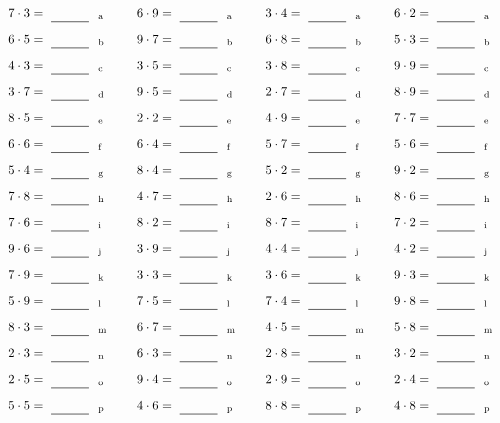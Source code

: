 \documentclass
[
  draft    = true,
  fontsize = 11pt,
  parskip  = half-
]
{scrartcl}
\begin{document}
\par\vfill\par
\begin{align*}
    \pline{7\cdot3}&=\rline{a}
  & \pline{6\cdot9}&=\rline{a}
  & \pline{3\cdot4}&=\rline{a}
  & \pline{6\cdot2}&=\rline{a} \\[1ex]
    \pline{6\cdot5}&=\rline{b}
  & \pline{9\cdot7}&=\rline{b}
  & \pline{6\cdot8}&=\rline{b}
  & \pline{5\cdot3}&=\rline{b} \\[1ex]
    \pline{4\cdot3}&=\rline{c}
  & \pline{3\cdot5}&=\rline{c}
  & \pline{3\cdot8}&=\rline{c}
  & \pline{9\cdot9}&=\rline{c} \\[1ex]
    \pline{3\cdot7}&=\rline{d}
  & \pline{9\cdot5}&=\rline{d}
  & \pline{2\cdot7}&=\rline{d}
  & \pline{8\cdot9}&=\rline{d} \\[1ex]
    \pline{8\cdot5}&=\rline{e}
  & \pline{2\cdot2}&=\rline{e}
  & \pline{4\cdot9}&=\rline{e}
  & \pline{7\cdot7}&=\rline{e} \\[1ex]
    \pline{6\cdot6}&=\rline{f}
  & \pline{6\cdot4}&=\rline{f}
  & \pline{5\cdot7}&=\rline{f}
  & \pline{5\cdot6}&=\rline{f} \\[1ex]
    \pline{5\cdot4}&=\rline{g}
  & \pline{8\cdot4}&=\rline{g}
  & \pline{5\cdot2}&=\rline{g}
  & \pline{9\cdot2}&=\rline{g} \\[1ex]
    \pline{7\cdot8}&=\rline{h}
  & \pline{4\cdot7}&=\rline{h}
  & \pline{2\cdot6}&=\rline{h}
  & \pline{8\cdot6}&=\rline{h} \\[1ex]
    \pline{7\cdot6}&=\rline{i}
  & \pline{8\cdot2}&=\rline{i}
  & \pline{8\cdot7}&=\rline{i}
  & \pline{7\cdot2}&=\rline{i} \\[1ex]
    \pline{9\cdot6}&=\rline{j}
  & \pline{3\cdot9}&=\rline{j}
  & \pline{4\cdot4}&=\rline{j}
  & \pline{4\cdot2}&=\rline{j} \\[1ex]
    \pline{7\cdot9}&=\rline{k}
  & \pline{3\cdot3}&=\rline{k}
  & \pline{3\cdot6}&=\rline{k}
  & \pline{9\cdot3}&=\rline{k} \\[1ex]
    \pline{5\cdot9}&=\rline{l}
  & \pline{7\cdot5}&=\rline{l}
  & \pline{7\cdot4}&=\rline{l}
  & \pline{9\cdot8}&=\rline{l} \\[1ex]
    \pline{8\cdot3}&=\rline{m}
  & \pline{6\cdot7}&=\rline{m}
  & \pline{4\cdot5}&=\rline{m}
  & \pline{5\cdot8}&=\rline{m} \\[1ex]
    \pline{2\cdot3}&=\rline{n}
  & \pline{6\cdot3}&=\rline{n}
  & \pline{2\cdot8}&=\rline{n}
  & \pline{3\cdot2}&=\rline{n} \\[1ex]
    \pline{2\cdot5}&=\rline{o}
  & \pline{9\cdot4}&=\rline{o}
  & \pline{2\cdot9}&=\rline{o}
  & \pline{2\cdot4}&=\rline{o} \\[1ex]
    \pline{5\cdot5}&=\rline{p}
  & \pline{4\cdot6}&=\rline{p}
  & \pline{8\cdot8}&=\rline{p}
  & \pline{4\cdot8}&=\rline{p}
\end{align*}
\end{document}
